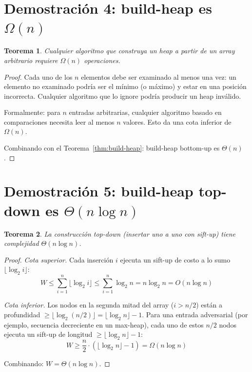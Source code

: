 \documentclass[11pt, letterpaper]{article}
\theoremstyle{definition}
\theoremstyle{plain}
\newtheorem{theorem}{Teorema}[section]
\theoremstyle{remark}
\begin{document}
\section{Demostración 4: build-heap es
  \texorpdfstring{$\Omega(n)$}{Omega(n)}}

\begin{theorem}\label{thm:lower-bound}
Cualquier algoritmo que construya un heap a partir de un array
arbitrario requiere $\Omega(n)$ operaciones.
\end{theorem}

\begin{proof}
Cada uno de los $n$ elementos debe ser examinado al menos una vez:
un elemento no examinado podría ser el mínimo (o máximo) y estar en
una posición incorrecta. Cualquier algoritmo que lo ignore podría
producir un heap inválido.

Formalmente: para $n$ entradas arbitrarias, cualquier algoritmo basado
en comparaciones necesita leer al menos $n$ valores. Esto da una cota
inferior de $\Omega(n)$.

Combinando con el Teorema~\ref{thm:build-heap}:
build-heap bottom-up es $\Theta(n)$.
\end{proof}

\section{Demostración 5: build-heap top-down es
  \texorpdfstring{$\Theta(n \log n)$}{Theta(n log n)}}

\begin{theorem}\label{thm:top-down}
La construcción top-down (insertar uno a uno con sift-up) tiene
complejidad $\Theta(n \log n)$.
\end{theorem}

\begin{proof}
\emph{Cota superior.} Cada inserción $i$ ejecuta un sift-up de costo
a lo sumo $\lfloor \log_2 i \rfloor$:
\[
  W \leq \sum_{i=1}^{n} \lfloor \log_2 i \rfloor
    \leq \sum_{i=1}^{n} \log_2 n
    = n \log_2 n = O(n \log n)
\]

\emph{Cota inferior.} Los nodos en la segunda mitad del array
($i > n/2$) están a profundidad
$\geq \lfloor \log_2(n/2) \rfloor = \lfloor \log_2 n \rfloor - 1$.
Para una entrada adversarial (por ejemplo, secuencia decreciente en un
max-heap), cada uno de estos $n/2$ nodos ejecuta un sift-up de longitud
$\geq \lfloor \log_2 n \rfloor - 1$:
\[
  W \geq \frac{n}{2} \cdot
    (\lfloor \log_2 n \rfloor - 1) = \Omega(n \log n)
\]

Combinando: $W = \Theta(n \log n)$.
\end{proof}
\end{document}
